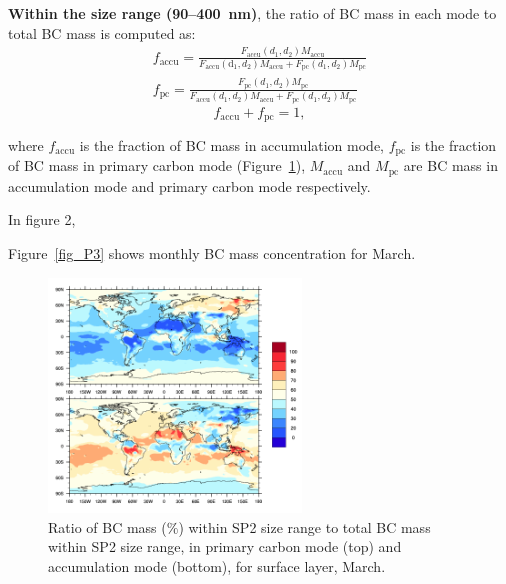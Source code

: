 \documentclass[11pt]{article}
\begin{document}
\noindent \textbf{Within the size range (90--400~nm)}, the ratio of BC mass in each mode to total BC mass is computed as:
\begin{align*}
f_{\text{accu}} = \frac{F_{\text{accu}}(d_{1}, d_{2})M_{\text{accu}}}{F_{\text{accu}}(\text{d}_{1}, d_{2})M_{\text{accu}}+F_{\text{pc}}(d_{1}, d_{2})M_{\text{pc}}}\\
f_{\text{pc}} = \frac{F_{\text{pc}}(d_{1}, d_{2})M_{\text{pc}}}{F_{\text{accu}}(d_{1}, d_{2})M_{\text{accu}}+F_{\text{pc}}(d_{1}, d_{2})M_{\text{pc}}}
\end{align*}
\[f_{\text{accu}} + f_{\text{pc}} = 1,\]

\noindent where $f_{\text{accu}}$ is the fraction of BC mass in accumulation mode, $f_{\text{pc}}$ is the fraction of BC mass in primary carbon mode (Figure~\ref{fig_P2}), $M_{\text{accu}}$ and $M_{\text{pc}}$ are BC mass in accumulation mode and primary carbon mode respectively.

\noindent In figure 2, 

\noindent Figure~\ref{fig_P3} shows monthly BC mass concentration for March.

\begin{figure}[!h] 
	\begin{center}
		\includegraphics[width = 0.6\textwidth]{Rplot03}
		\caption[]{\label{fig_P2} Ratio of BC mass ($\%$) within SP2 size range to total BC mass within SP2 size range, in primary carbon mode (top) and accumulation mode (bottom), for surface layer, March.}
	\end{center}
\end{figure}
\end{document}
